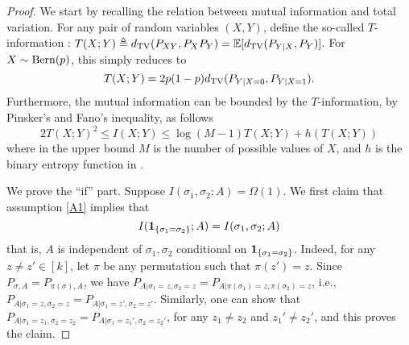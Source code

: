 \begin{proof}
We start by recalling the relation between mutual information and total variation.
For any pair of random variables $(X,Y)$, define the so-called $T$-information \cite{Csiszar96}:
$T(X;Y) \triangleq d_{\rm TV}(P_{XY}, P_XP_Y) = \mathbb{E}[d_{\rm TV}(P_{Y|X}, P_Y)]$.
For $X \sim {\rm Bern}(p)$, this simply reduces to 
\begin{equation}
T(X;Y) = 2p(1-p) d_{\rm TV}(P_{Y|X=0}, P_{Y|X=1}).
\label{eq:Tbern}
\end{equation}
Furthermore, the mutual information can be bounded by the $T$-information, 
by Pinsker's and Fano's inequality, as follows \cite[Eq.~(84) and Prop.~12]{PW14a}
\begin{equation}
 2 T(X;Y)^2 \leq I(X;Y)  \leq \log (M-1) T(X;Y) + h(T(X;Y))		
	\label{eq:TI}
\end{equation}
where in the upper bound $M$ is the number of possible values of $X$, and $h$ is the binary entropy function in .


We prove the ``if'' part.
Suppose 
$I(\sigma_1, \sigma_2; A) = \Omega(1)$.
We first claim that assumption \ref{A1} implies that 
\begin{equation}
I ({\mathbf{1}_{\left\{{\sigma_1 =\sigma_2}\right\}}}; A)=I(\sigma_1, \sigma_2; A)
\label{eq:ss}
\end{equation}
that is,
 $A$ is independent of $\sigma_1,\sigma_2$ conditional on ${\mathbf{1}_{\left\{{\sigma_1 =\sigma_2}\right\}}}$. 
Indeed, 
for any $z \neq z'\in [k]$, let $\pi$ be any permutation such that 
$\pi(z')=z.$
Since $P_{\sigma, A} =  P_{\pi(\sigma), A}$, 
we have $P_{A|\sigma_1=z,  \sigma_2=z} =  P_{A| \pi(\sigma_1)=z,  \pi(\sigma_2)=z }$, i.e., 
$P_{A |\sigma_1=z, \sigma_2=z} =  P_{A| \sigma_1 =z',  \sigma_2 =z' }$. 
Similarly, one can show that 
$P_{A|\sigma_1=z_1, \sigma_2=z_2} =  P_{A| \sigma_1 =z_1',  \sigma_2 =z_2'}$, 
for any $z_1 \neq z_2$ and $z_1'\neq z_2'$, and this proves the claim.


\end{proof}
